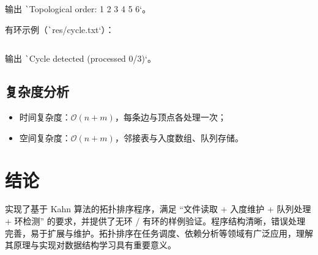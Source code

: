 \documentclass[12pt, a4paper]{ctexart}
\begin{document}
\inputminted{text}{../res/dag.txt}

输出 \texttt`Topological order: 1 2 3 4 5 6`。

有环示例（\texttt`res/cycle.txt`）：

\inputminted{text}{../res/cycle.txt}

输出 \texttt`Cycle detected (processed 0/3)`。

\subsection{复杂度分析}

\begin{itemize}
    \item 时间复杂度：$\mathcal{O}\left(n+m\right)$，每条边与顶点各处理一次；
    \item 空间复杂度：$\mathcal{O}\left(n+m\right)$，邻接表与入度数组、队列存储。
\end{itemize}

\section{结论}

实现了基于 Kahn 算法的拓扑排序程序，满足 ``文件读取 + 入度维护 + 队列处理 + 环检测'' 的要求，并提供了无环 / 有环的样例验证。程序结构清晰，错误处理完善，易于扩展与维护。拓扑排序在任务调度、依赖分析等领域有广泛应用，理解其原理与实现对数据结构学习具有重要意义。
\end{document}
